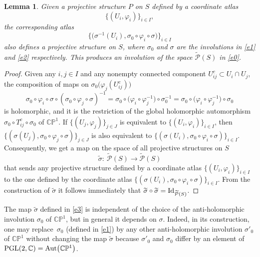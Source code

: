 \documentclass[10pt,a4paper]{amsart}
\numberwithin{equation}{section}
\newtheorem{Lemma}[Theorem]{Lemma}
\begin{document}
\begin{Lemma}\label{invoproj}
Given a projective structure $P$ on $S$ defined by a coordinate atlas
\[
\{(U_i, \varphi_i)\}_{i\in I},\]
the
corresponding atlas
\[
\big\{\bigl(\sigma^{-1}(U_i), \sigma_0\circ\varphi_i\circ\sigma\bigr)\big\}_{i\in
I}
\] also defines a projective structure on $S$, where $\sigma_0$ and $\sigma$ are the involutions
in \eqref{e1} and \eqref{e2} respectively. This produces
an involution of the space $\widetilde{\mathcal P}(S)$ in \eqref{e0}.
\end{Lemma}

\begin{proof}
Given any $i, j \in I$ and any nonempty connected component $U^c_{ij} \subset U_i\cap U_j$,
the composition of maps on $\sigma_0\bigl(\varphi_j(U^c_{ij})\bigr)$
\[
\sigma_0\circ\varphi_i\circ\sigma\circ (\sigma_0\circ\varphi_j\circ\sigma)^{-1} =
\sigma_0\circ \bigl(\varphi_i\circ \varphi^{-1}_j\bigr)\circ\sigma^{-1}_0 =
\sigma_0\circ \bigl(\varphi_i\circ \varphi^{-1}_j\bigr)\circ\sigma_0
\]
is holomorphic, and it is the restriction of the global holomorphic automorphism
$\sigma_0\circ T^c_{ij}\circ\sigma_0$ of ${\mathbb C}{\mathbb P}^1$.
If $\{(U_j, \varphi_j)\}_{j\in J}$ is
equivalent to $\{(U_i, \varphi_i)\}_{i\in I}$, then $\{(\sigma(U_j),
\sigma_0\circ\varphi_j\circ\sigma)\}_{j\in J}$ is also equivalent to $\{(\sigma(U_i),
\sigma_0\circ\varphi_i\circ\sigma)\}_{i\in I}$. Consequently, we get a map on the space of all projective structures on $S$
\begin{equation}\label{e3}
\widetilde{\sigma} \colon\ \widetilde{\mathcal P}(S)
\longrightarrow \widetilde{\mathcal P}(S)
\end{equation}
that sends any projective structure defined by a coordinate
atlas $\{(U_i, \varphi_i)\}_{i\in I}$ to the one defined by the
coordinate atlas $\{(\sigma(U_i), \sigma_0\circ\varphi_i\circ\sigma)\}_{i\in I}$. From the construction of
$\widetilde{\sigma}$ it follows immediately that
 $\widetilde{\sigma}\circ\widetilde{\sigma} = {\rm Id}_{\widetilde{\mathcal
P}(S)}$.
\end{proof}

\begin{Remark}\label{rem1}
The map $\widetilde{\sigma}$ defined in \eqref{e3} is independent
of the choice of the anti-holomorphic involution $\sigma_0$ of ${\mathbb C}{\mathbb P}^1$, but
in general it depends on $\sigma$. Indeed, in its construction, one may replace~$\sigma_0$ (defined in \eqref{e1}) by any other anti-holomorphic involution $\sigma'_0$ of
${\mathbb C}{\mathbb P}^1$ without changing the map $\widetilde{\sigma}$ because
$\sigma'_0$ and $\sigma_0$ differ by an element of ${\rm PGL}(2,{\mathbb C}) =
{\rm Aut}\bigl({\mathbb C}{\mathbb P}^1\bigr)$.
\end{Remark}
\end{document}
